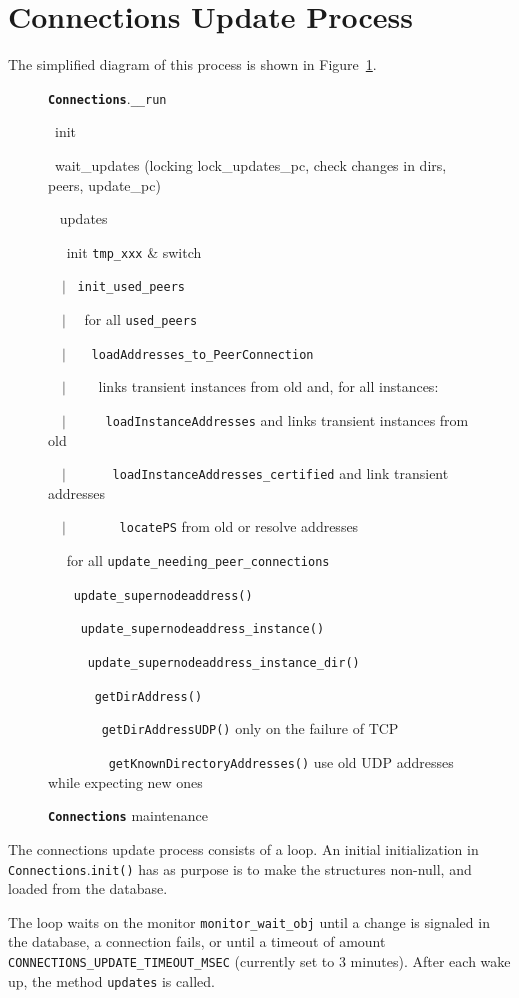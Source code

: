\documentclass{book}
\newcommand{\pkg}[1]{{\tt #1}}
\newcommand{\cls}[1]{{\tt\bf #1}}
\newcommand{\mth}[1]{{\tt #1}}
\newcommand{\mmb}[1]{{\tt #1}}
\begin{document}
\section{Connections Update Process}
The simplified diagram of this process is shown in Figure~\ref{fig:conn_update}.
\begin{figure}[!ht]
\noindent
\noindent
\strut\cls{Connections}.\mth{\_\_run} \\
\strut~init \\
\strut~wait\_updates (locking lock\_updates\_pc, check changes in dirs, peers, update\_pc) \\
\strut~ updates\\
\strut~~ init \mmb{tmp\_xxx} \& switch \\
\strut~~$|$~ \mth{init\_used\_peers} \\
\strut~~$|$~~ for all \mmb{used\_peers} \\
\strut~~$|$~~~ \mth{loadAddresses\_to\_PeerConnection} \\
\strut~~$|$~~~~ links transient instances from old and, for all instances:\\
\strut~~$|$~~~~~ \mth{loadInstanceAddresses}  and links transient instances from old\\
\strut~~$|$~~~~~~ \mth{loadInstanceAddresses\_certified} and link transient addresses\\
\strut~~$|$~~~~~~~ \mth{locatePS} from old  or resolve addresses\\
\strut~~ for all \mmb{update\_needing\_peer\_connections} \\
\strut~~~ \mth{update\_supernodeaddress()} \\
\strut~~~~ \mth{update\_supernodeaddress\_instance()} \\
\strut~~~~~ \mth{update\_supernodeaddress\_instance\_dir()} \\
\strut~~~~~~ \mth{getDirAddress()} \\
\strut~~~~~~~ \mth{getDirAddressUDP()} only on the failure of TCP \\
\strut~~~~~~~~ \mth{getKnownDirectoryAddresses()} use old UDP addresses while expecting new ones \\
\caption{\cls{Connections} maintenance}\label{fig:conn_update}
\end{figure}
The connections update process consists of a loop. 
An initial initialization in \pkg{Connections}.\mth{init()} has as purpose is to make the 
structures non-null, and loaded from the database.

The loop waits on the monitor \mmb{monitor\_wait\_obj} until a change is signaled in the database, a connection fails, or until a timeout of amount \mmb{CONNECTIONS\_UPDATE\_TIMEOUT\_MSEC} (currently set to 3 minutes).
After each wake up, the method \mth{updates} is called.
\end{document}
